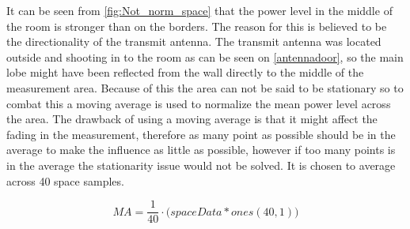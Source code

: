 It can be seen from \autoref{fig:Not_norm_space} that the power level in the middle of the room is stronger than on the borders. The reason for this is believed to be the directionality of the transmit antenna. The transmit antenna was located outside and shooting in to the room as can be seen on \autoref{antennadoor}, so the main lobe might have been reflected from the wall directly to the middle of the measurement area. Because of this the area can not be said to be stationary so to combat this a moving average is used to normalize the mean power level across the area. The drawback of using a moving average is that it might affect the fading in the measurement, therefore as many point as possible should be in the average to make the influence as little as possible, however if too many points is in the average the stationarity issue would not be solved. It is chosen to average across 40 space samples.

\begin{equation}
MA = \frac{1}{40}\cdot \Big(spaceData*ones(40,1)\Big)
\end{equation}




%
%
%
%

